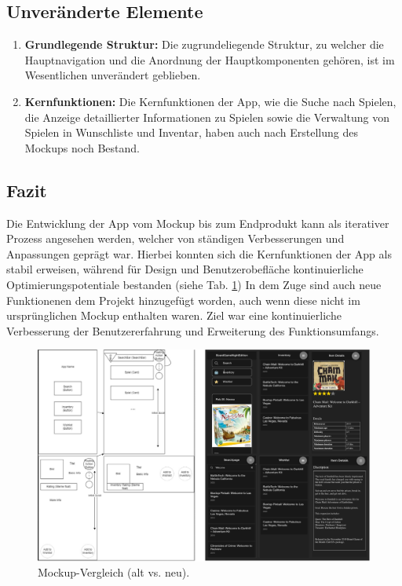 \subsection{Unveränderte Elemente}
\begin{enumerate}
    \item \textbf{Grundlegende Struktur:} Die zugrundeliegende Struktur, zu welcher die Hauptnavigation und die Anordnung der Hauptkomponenten gehören, ist im Wesentlichen unverändert geblieben.
    \item \textbf{Kernfunktionen:} Die Kernfunktionen der App, wie die Suche nach Spielen, die Anzeige detaillierter Informationen zu Spielen sowie die Verwaltung von Spielen in Wunschliste und Inventar, haben auch nach Erstellung des Mockups noch Bestand.
\end{enumerate}
\subsection{Fazit}
Die Entwicklung der App vom Mockup bis zum Endprodukt kann als iterativer Prozess angesehen werden, welcher
von ständigen Verbesserungen und Anpassungen geprägt war. Hierbei konnten sich die Kernfunktionen der App
als stabil erweisen, während für Design und Benutzerobefläche kontinuierliche Optimierungspotentiale bestanden (siehe Tab. \ref{fig:optimierung})
In dem Zuge sind auch neue Funktionenen dem Projekt hinzugefügt worden, auch wenn diese nicht im ursprünglichen
Mockup enthalten waren. Ziel war eine kontinuierliche Verbesserung der Benutzererfahrung und Erweiterung des Funktionsumfangs.
\begin{figure}[H]
    \centering
    \includegraphics[width=1\textwidth]{graphics/mockup_vergleich.png}
    \caption{Mockup-Vergleich (alt vs. neu).}
    \label{fig:optimierung}
\end{figure}